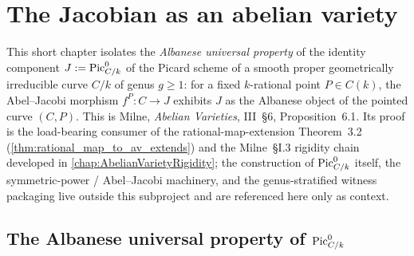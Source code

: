 \chapter{The Jacobian as an abelian variety}
\label{chap:Jacobian}

This short chapter isolates the \emph{Albanese universal property} of the identity
component \(J := \operatorname{Pic}^0_{C/k}\) of the Picard scheme of a smooth proper geometrically
irreducible curve \(C/k\) of genus \(g \ge 1\): for a fixed \(k\)-rational point
\(P \in C(k)\), the Abel--Jacobi morphism \(f^P\colon C \to J\) exhibits \(J\) as the
Albanese object of the pointed curve \((C,P)\).  This is Milne, \emph{Abelian Varieties},
III~\S6, Proposition~6.1.  Its proof is the load-bearing consumer of the
rational-map-extension Theorem~3.2 (\cref{thm:rational_map_to_av_extends}) and the
Milne~\S I.3 rigidity chain developed in \cref{chap:AbelianVarietyRigidity}; the
construction of \(\operatorname{Pic}^0_{C/k}\) itself, the symmetric-power / Abel--Jacobi machinery,
and the genus-stratified witness packaging live outside this subproject and are
referenced here only as context.

\section{The Albanese universal property of \(\operatorname{Pic}^0_{C/k}\)}

